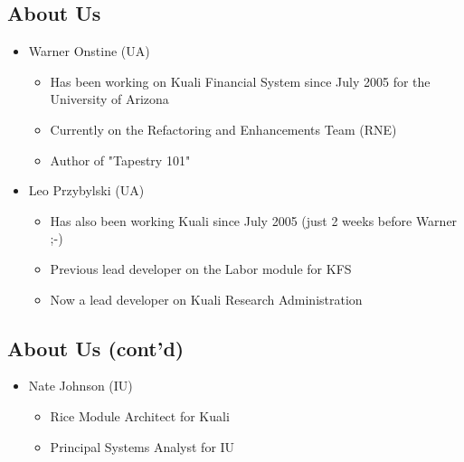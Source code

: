 \documentclass[12pt,notitlepage]{article}
\author{Warner Onstine and Leo Przybylski}
\subtitle{Day 1}
\affiliation{University of Arizona}
\begin{document}
  \W \begin{s5presentation}
  \maketitle
  \W \begin{s5slide}
    \W \section{About Us}
    \begin{ifhtml}
        \begin{itemize}
        \item Warner Onstine (UA)
            \begin{itemize}
            \item Has been working on Kuali Financial System since July 2005 for the University of Arizona
            \item Currently on the Refactoring and Enhancements Team (RNE)
            \item Author of "Tapestry 101"
            \end{itemize}
        \item Leo Przybylski (UA)
            \begin{itemize}
            \item Has also been working Kuali since July 2005 (just 2 weeks before Warner ;-)
            \item Previous lead developer on the Labor module for KFS
            \item Now a lead developer on Kuali Research Administration
            \end{itemize}
        \end{itemize}
    \end{ifhtml} 
  \W \end{s5slide}
  \W \begin{s5slide}
      \W \section{About Us (cont'd)}
      \begin{ifhtml}
          \begin{itemize}
          \item Nate Johnson (IU)
              \begin{itemize}
              \item Rice Module Architect for Kuali
              \item Principal Systems Analyst for IU

\end{itemize}
\end{itemize}
\end{ifhtml}
\end{s5slide}
\end{s5presentation}
\end{document}
